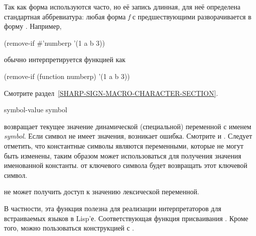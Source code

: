 \begin{defspec}
Так как форма  используются часто, но её запись длинная,
для неё определена стандартная аббревиатура: любая форма \emph{f} с
предшествующими  разворачивается в форму .
Например,
\begin{lisp}
(remove-if \#'numberp '(1 a b 3))
\end{lisp}
обычно интерпретируется функцией  как
\begin{lisp}
(remove-if (function numberp) '(1 a b 3))
\end{lisp}
Смотрите раздел~\ref{SHARP-SIGN-MACRO-CHARACTER-SECTION}.
\end{defspec}

\begin{defun}[Function]
symbol-value symbol

 возвращает текущее значение динамической (специальной)
переменной с именем \emph{symbol}.
Если символ не имеет значения, возникает ошибка. Смотрите  и
. 
Следует отметить, что константные символы являются переменными, которые не могут
быть изменены, таким образом  может использоваться для
получения значения именованной константы.  от ключевого
символа будет возвращать этот ключевой символ.

 не может получить доступ к значению лексической переменной.

В частности, эта функция полезна для реализации интерпретаторов для встраиваемых
языков в Lisp'е.
Соответствующая функция присваивания . Кроме того, можно пользоваться
конструкцией  с .
\end{defun}

